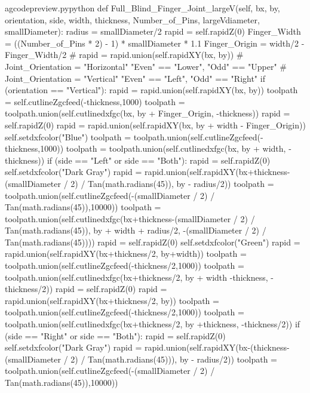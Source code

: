 \documentclass{ltxdoc}
\begin{document}
\begin{writecode}{a}{gcodepreview.py}{python}
    def Full_Blind_Finger_Joint_largeV(self, bx, by, orientation, side, width, thickness, Number_of_Pins, largeVdiameter, smallDiameter):
        radius = smallDiameter/2
        rapid = self.rapidZ(0)
        Finger_Width = ((Number_of_Pins * 2) - 1) * smallDiameter * 1.1
        Finger_Origin = width/2 - Finger_Width/2
    #    rapid = rapid.union(self.rapidXY(bx, by))
    # Joint_Orientation = "Horizontal" "Even" == "Lower", "Odd" == "Upper"
    # Joint_Orientation = "Vertical" "Even" == "Left", "Odd" == "Right"
        if (orientation == "Vertical"):
            rapid = rapid.union(self.rapidXY(bx, by))
            toolpath = self.cutlineZgcfeed(-thickness,1000)
            toolpath = toolpath.union(self.cutlinedxfgc(bx, by + Finger_Origin, -thickness))
            rapid = self.rapidZ(0)
            rapid = rapid.union(self.rapidXY(bx, by + width - Finger_Origin))
            self.setdxfcolor("Blue")
            toolpath = toolpath.union(self.cutlineZgcfeed(-thickness,1000))
            toolpath = toolpath.union(self.cutlinedxfgc(bx, by + width, -thickness))
            if (side == "Left" or side == "Both"):
                rapid = self.rapidZ(0)
                self.setdxfcolor("Dark Gray")
                rapid = rapid.union(self.rapidXY(bx+thickness-(smallDiameter / 2) / Tan(math.radians(45)), by - radius/2))
                toolpath = toolpath.union(self.cutlineZgcfeed(-(smallDiameter / 2) / Tan(math.radians(45)),10000))
                toolpath = toolpath.union(self.cutlinedxfgc(bx+thickness-(smallDiameter / 2) / Tan(math.radians(45)), by + width + radius/2, -(smallDiameter / 2) / Tan(math.radians(45))))
                rapid = self.rapidZ(0)
                self.setdxfcolor("Green")
                rapid = rapid.union(self.rapidXY(bx+thickness/2, by+width))
                toolpath = toolpath.union(self.cutlineZgcfeed(-thickness/2,1000))
                toolpath = toolpath.union(self.cutlinedxfgc(bx+thickness/2, by + width -thickness, -thickness/2))
                rapid = self.rapidZ(0)
                rapid = rapid.union(self.rapidXY(bx+thickness/2, by))
                toolpath = toolpath.union(self.cutlineZgcfeed(-thickness/2,1000))
                toolpath = toolpath.union(self.cutlinedxfgc(bx+thickness/2, by +thickness, -thickness/2))
            if (side == "Right" or side == "Both"):
                rapid = self.rapidZ(0)
                self.setdxfcolor("Dark Gray")
                rapid = rapid.union(self.rapidXY(bx-(thickness-(smallDiameter / 2) / Tan(math.radians(45))), by - radius/2))
                toolpath = toolpath.union(self.cutlineZgcfeed(-(smallDiameter / 2) / Tan(math.radians(45)),10000))

\end{writecode}
\end{document}
